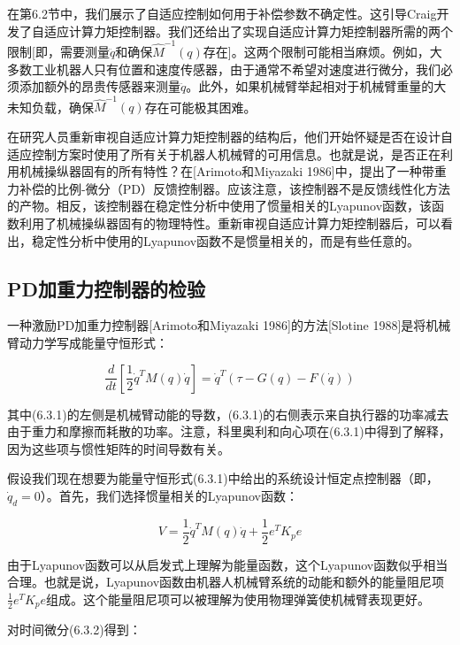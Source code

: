 \documentclass[12pt,a4paper]{ctexart}
\begin{document}
在第6.2节中，我们展示了自适应控制如何用于补偿参数不确定性。这引导Craig开发了自适应计算力矩控制器。我们还给出了实现自适应计算力矩控制器所需的两个限制[即，需要测量$\ddot{q}$和确保$\hat{M}^{-1}(q)$存在]。这两个限制可能相当麻烦。例如，大多数工业机器人只有位置和速度传感器，由于通常不希望对速度进行微分，我们必须添加额外的昂贵传感器来测量$\ddot{q}$。此外，如果机械臂举起相对于机械臂重量的大未知负载，确保$\hat{M}^{-1}(q)$存在可能极其困难。

在研究人员重新审视自适应计算力矩控制器的结构后，他们开始怀疑是否在设计自适应控制方案时使用了所有关于机器人机械臂的可用信息。也就是说，是否正在利用机械操纵器固有的所有特性？在[Arimoto和Miyazaki 1986]中，提出了一种带重力补偿的比例-微分（PD）反馈控制器。应该注意，该控制器不是反馈线性化方法的产物。相反，该控制器在稳定性分析中使用了惯量相关的Lyapunov函数，该函数利用了机械操纵器固有的物理特性。重新审视自适应计算力矩控制器后，可以看出，稳定性分析中使用的Lyapunov函数不是惯量相关的，而是有些任意的。

\subsection*{PD加重力控制器的检验}

一种激励PD加重力控制器[Arimoto和Miyazaki 1986]的方法[Slotine 1988]是将机械臂动力学写成能量守恒形式：

\begin{equation}\label{eq:6.3.1}
\frac{d}{dt}\left[\frac{1}{2}\dot{q}^T M(q) \dot{q}\right] = \dot{q}^T (\tau - G(q) - F(\dot{q}))
\end{equation}

其中(6.3.1)的左侧是机械臂动能的导数，(6.3.1)的右侧表示来自执行器的功率减去由于重力和摩擦而耗散的功率。注意，科里奥利和向心项在(6.3.1)中得到了解释，因为这些项与惯性矩阵的时间导数有关。

假设我们现在想要为能量守恒形式(6.3.1)中给出的系统设计恒定点控制器（即，$\dot{q}_d = 0$）。首先，我们选择惯量相关的Lyapunov函数：

\begin{equation}\label{eq:6.3.2}
V = \frac{1}{2}\dot{q}^T M(q) \dot{q} + \frac{1}{2}e^T K_p e
\end{equation}

由于Lyapunov函数可以从启发式上理解为能量函数，这个Lyapunov函数似乎相当合理。也就是说，Lyapunov函数由机器人机械臂系统的动能和额外的能量阻尼项$\frac{1}{2}e^T K_p e$组成。这个能量阻尼项可以被理解为使用物理弹簧使机械臂表现更好。

对时间微分(6.3.2)得到：
\end{document}

